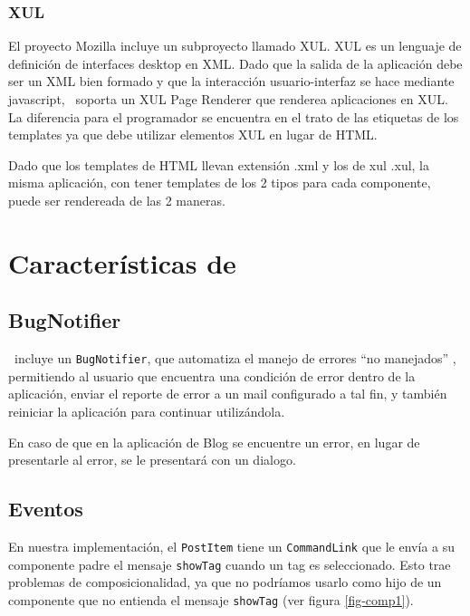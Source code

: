 \subsubsection{XUL}

El proyecto Mozilla incluye un subproyecto llamado XUL\cite{XUL}. XUL es un lenguaje de definición de interfaces desktop en XML. Dado que la salida de la aplicación debe ser un XML bien formado y que la interacción usuario-interfaz se hace mediante javascript, \PWB \ soporta un XUL Page Renderer que renderea aplicaciones en XUL. La diferencia para el programador se encuentra en el trato de las etiquetas de los templates ya que debe utilizar elementos XUL en lugar de HTML.

Dado que los templates de HTML llevan extensión .xml y los de xul .xul, la misma aplicación, con tener templates de los 2 tipos para cada componente, puede ser rendereada de las 2 maneras.

\section{Características de \PITS}


\subsection{BugNotifier}

\PWB \ incluye un \verb"BugNotifier", que automatiza el manejo de errores ``no manejados'' , permitiendo al usuario que encuentra una condición de error dentro de la aplicación, enviar el reporte de error a un mail configurado a tal fin, y también reiniciar la aplicación para continuar utilizándola.

En caso de que en la aplicación de Blog se encuentre un error, en lugar de presentarle al error, se le presentará con un dialogo.

\subsection{Eventos}
\label{sub-events}

En nuestra implementación, el \verb"PostItem" tiene un \verb"CommandLink" que le envía a su componente padre el mensaje \verb"showTag" cuando un tag es seleccionado. Esto trae problemas de composicionalidad, ya que no podríamos usarlo como hijo de un componente que no entienda el mensaje \verb"showTag" (ver figura \ref{fig-comp1}).

